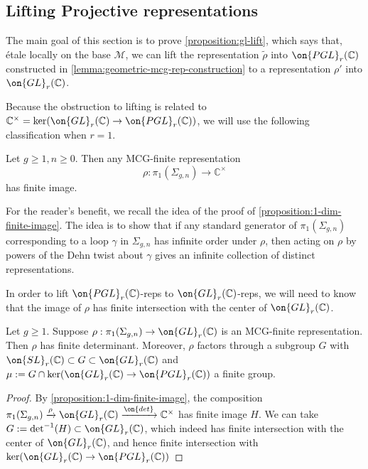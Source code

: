 \subsection{Lifting Projective representations}
\label{subsection:lifting-projective}

The main goal of this section is to prove \autoref{proposition:gl-lift},
which says that, \'etale locally on the base $\mathscr{M}$, we can lift the representation $\widetilde{\rho}$ into
$\on{PGL}_r(\mathbb C)$
constructed in \autoref{lemma:geometric-mcg-rep-construction}
to a representation $\rho'$ into $\on{GL}_r(\mathbb C)$.

Because the obstruction to lifting is related to $\mathbb C^\times =
\ker(\on{GL}_r(\mathbb C) \to
\on{PGL}_r(\mathbb C))$, we will use the following classification when
$r = 1$.

\begin{proposition}
\notready
	\label{proposition:1-dim-finite-image}
	Let $g\geq 1, n\geq 0$. Then any MCG-finite representation $$\rho: \pi_1(\Sigma_{g,n})\to \mathbb{C}^\times$$ has finite image.
\end{proposition}
For the reader's benefit, we recall the idea of the proof of
\autoref{proposition:1-dim-finite-image}.
The idea is to show
that if any standard generator of $\pi_1(\Sigma_{g,n})$ corresponding to a loop
$\gamma$ in $\Sigma_{g,n}$ has infinite order under $\rho$, then acting on $\rho$ by powers of the
Dehn twist about $\gamma$ gives an infinite collection of distinct
representations.

In order to lift
$\on{PGL}_r(\mathbb C)$-reps to
$\on{GL}_r(\mathbb C)$-reps,
we will need to know
that the image of $\rho$ has finite
intersection with the center of $\on{GL}_r(\mathbb C)$.
\begin{lemma}
\notready
	\label{lemma:finite-central-part}
	Let $g\geq 1$.
	Suppose $\rho: \pi_1(\Sigma_{g,n}) \to \on{GL}_r(\mathbb C)$ is an MCG-finite representation.
	Then $\rho$ has finite determinant.
	Moreover, $\rho$ factors through a subgroup $G$ with $\on{SL}_r(\mathbb C) \subset G
	\subset \on{GL}_r(\mathbb C)$ and $\mu := G \cap \ker(\on{GL}_r(\mathbb
	C) \to \on{PGL}_r(\mathbb C))$ a finite group.
\end{lemma}
\begin{proof}
	By \autoref{proposition:1-dim-finite-image}, the composition
	$\pi_1(\Sigma_{g,n}) \xrightarrow{\rho} \on{GL}_r(\mathbb C) \xrightarrow{\on{det}}
	\mathbb C^\times$ has finite image $H$.
	We can take $G := \det^{-1}(H) \subset \on{GL}_r(\mathbb{C})$,
	which indeed has finite intersection with the center of
	$\on{GL}_r(\mathbb C)$, and hence finite intersection with
	$\ker(\on{GL}_r(\mathbb C) \to \on{PGL}_r(\mathbb C))$
\end{proof}

